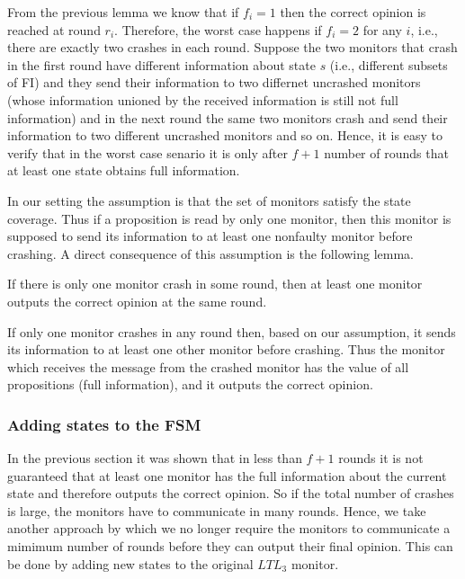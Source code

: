 From the previous lemma we know that if $f_i = 1$ then the correct opinion is reached at round $r_i$. Therefore, the worst case happens if $f_i = 2$ for any $i$, i.e., there are exactly two crashes in each round. Suppose the two monitors that crash in the first round have different information about state $s$ (i.e., different subsets of FI) and they send their information to two differnet uncrashed monitors (whose information unioned by the received information is still not full information) and in the next round the same two monitors crash and send their information to two different uncrashed monitors and so on. Hence, it is easy to verify that in the worst case senario it is only after $f + 1$ number of rounds that at least one state obtains full information. 



In our setting the assumption is that the set of monitors satisfy the state coverage. Thus if a proposition is read by only one monitor, then this monitor is supposed to send its information to at least one nonfaulty monitor before crashing. A direct consequence of this assumption is the following lemma.

\begin{lemma}
If there is only one monitor crash in some round, then at least one monitor outputs the correct opinion at the same round. 
\end{lemma}

If only one monitor crashes in any round then, based on our assumption, it sends its information to at least one other monitor before crashing. Thus the monitor which receives the message from the crashed monitor has the value of all propositions (full information), and it outputs the correct opinion. 



\subsubsection{\textbf{Adding states to the FSM}}

In the previous section it was shown that in less than $f + 1$ rounds it is not guaranteed that at least one monitor has the full information about the current state and therefore outputs the correct opinion. So if the total number of crashes is large, the monitors have to communicate in many rounds. Hence, we take another approach by which we no longer require the monitors to communicate a mimimum number of rounds before they can output their final opinion. This can be done by adding new states to the original $LTL_3$ monitor. 

